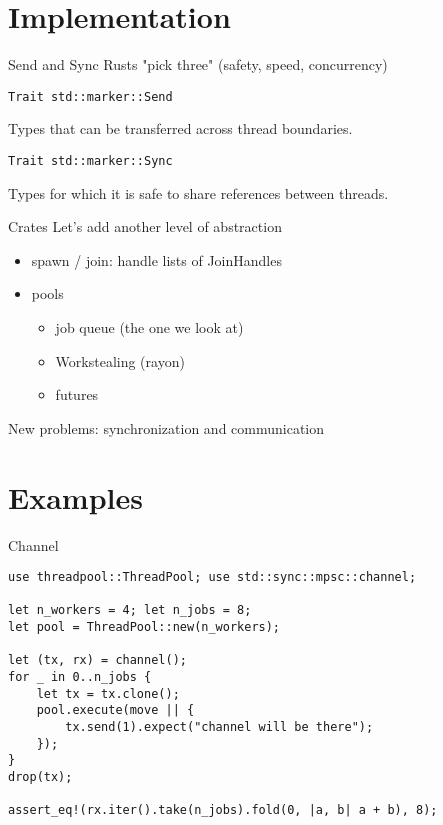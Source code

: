 \documentclass[aspectratio=1610,t]{beamer}
\begin{document}
{
\section{Implementation}
}

\begin{frame}[fragile]{Send and Sync}
Rusts "pick three" (safety, speed, concurrency)

\begin{verbatim}
Trait std::marker::Send
\end{verbatim}
Types that can be transferred across thread boundaries.

\begin{verbatim}
Trait std::marker::Sync
\end{verbatim}
Types for which it is safe to share references between threads.

\end{frame}

\begin{frame}[fragile]{Crates}
Let's add another level of abstraction
\begin{itemize}
  \item spawn / join: handle lists of JoinHandles
  \item pools \begin{itemize}
      \item job queue (the one we look at)
      \item Workstealing (rayon)
      \item futures
    \end{itemize}
\end{itemize}

New problems: synchronization and communication

\end{frame}

{
\section{Examples}
}
\begin{frame}[fragile]{Channel}
\begin{verbatim}
use threadpool::ThreadPool; use std::sync::mpsc::channel;

let n_workers = 4; let n_jobs = 8;
let pool = ThreadPool::new(n_workers);

let (tx, rx) = channel();
for _ in 0..n_jobs {
    let tx = tx.clone();
    pool.execute(move || {
        tx.send(1).expect("channel will be there");
    });
}
drop(tx);

assert_eq!(rx.iter().take(n_jobs).fold(0, |a, b| a + b), 8);
\end{verbatim}
\end{frame}
\end{document}
